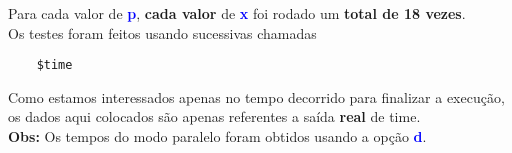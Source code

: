 \documentclass[11pt]{article}
\begin{document}
\noindent Para cada valor de \textbf{\textcolor{blue}{p}}, \textbf{cada valor} de \textbf{\textcolor{blue}{x}} foi rodado um \textbf{total de 18 vezes}. \\
\noindent Os testes foram feitos usando sucessivas chamadas

\color{orange}
\begin{verbatim}
    $time
\end{verbatim}
\color{black}

\noindent Como estamos interessados apenas no tempo decorrido para finalizar a execução, os dados aqui colocados são apenas referentes a saída \textbf{real} de \color{orange} time\color{black}.
\\

\noindent\textbf{Obs:} Os tempos do modo paralelo foram obtidos usando a opção \textbf{\textcolor{blue}{d}}.
\pagebreak
\end{document}
